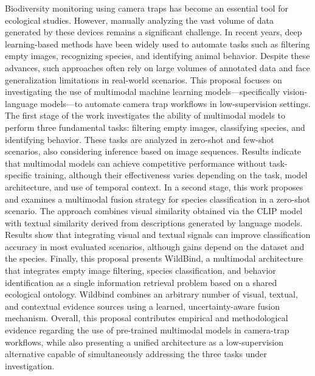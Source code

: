 Biodiversity monitoring using camera traps has become an essential tool for ecological studies. However, manually analyzing the vast volume of data generated by these devices remains a significant challenge. In recent years, deep learning-based methods have been widely used to automate tasks such as filtering empty images, recognizing species, and identifying animal behavior. Despite these advances, such approaches often rely on large volumes of annotated data and face generalization limitations in real-world scenarios. This proposal focuses on investigating the use of multimodal machine learning models—specifically vision-language models—to automate camera trap workflows in low-supervision settings. The first stage of the work investigates the ability of multimodal models to perform three fundamental tasks: filtering empty images, classifying species, and identifying behavior. These tasks are analyzed in zero-shot and few-shot scenarios, also considering inference based on image sequences. Results indicate that multimodal models can achieve competitive performance without task-specific training, although their effectiveness varies depending on the task, model architecture, and use of temporal context. In a second stage, this work proposes and examines a multimodal fusion strategy for species classification in a zero-shot scenario. The approach combines visual similarity obtained via the CLIP model with textual similarity derived from descriptions generated by language models. Results show that integrating visual and textual signals can improve classification accuracy in most evaluated scenarios, although gains depend on the dataset and the species. Finally, this proposal presents WildBind, a multimodal architecture that integrates empty image filtering, species classification, and behavior identification as a single information retrieval problem based on a shared ecological ontology. Wildbind combines an arbitrary number of visual, textual, and contextual evidence sources using a learned, uncertainty-aware fusion mechanism. Overall, this proposal contributes empirical and methodological evidence regarding the use of pre-trained multimodal models in camera-trap workflows, while also presenting a unified architecture as a low-supervision alternative capable of simultaneously addressing the three tasks under investigation.

